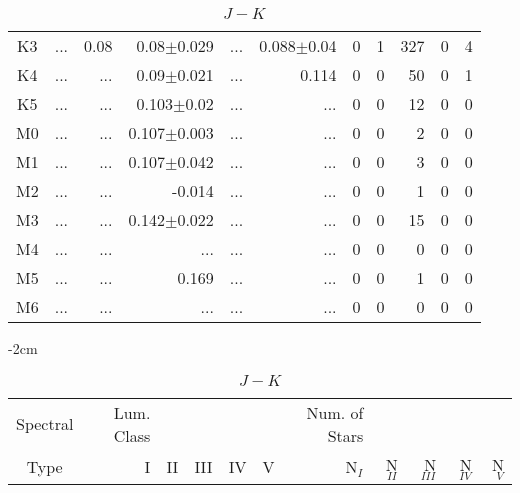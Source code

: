 \begin{table}[t]
\begin{table}[t]
\begin{center}
\begin{tabular}{c|rrrrr|rrrrr}
    K3	&	 ...	&	0.08	&	0.08$\pm$0.029	&	 ...	&	0.088$\pm$0.04	&	0	&	1	&	327	&	0	&	4	\\
    K4	&	 ...	&	 ...	&	0.09$\pm$0.021	&	 ...	&	0.114	&	0	&	0	&	50	&	0	&	1	\\
    K5	&	 ...	&	 ...	&	0.103$\pm$0.02	&	 ...	&	 ...	&	0	&	0	&	12	&	0	&	0	\\
    M0	&	 ...	&	 ...	&	0.107$\pm$0.003	&	 ...	&	 ...	&	0	&	0	&	2	&	0	&	0	\\
    M1	&	 ...	&	 ...	&	0.107$\pm$0.042	&	 ...	&	 ...	&	0	&	0	&	3	&	0	&	0	\\
    M2	&	 ...	&	 ...	&	-0.014	&	 ...	&	 ...	&	0	&	0	&	1	&	0	&	0	\\
    M3	&	 ...	&	 ...	&	0.142$\pm$0.022	&	 ...	&	 ...	&	0	&	0	&	15	&	0	&	0	\\
    M4	&	 ...	&	 ...	&	 ...	&	 ...	&	 ...	&	0	&	0	&	0	&	0	&	0	\\
    M5	&	 ...	&	 ...	&	0.169	&	 ...	&	 ...	&	0	&	0	&	1	&	0	&	0	\\
    M6	&	 ...	&	 ...	&	 ...	&	 ...	&	 ...	&	0	&	0	&	0	&	0	&	0	\\
        \bottomrule
        \end{tabular}
    \end{center}
    \end{table}
    
    \begin{table}[t]
    \tiny
    \centering
    \caption{$J-K$}
    \begin{center}
        \addtolength{\leftskip} {-2cm}
        \addtolength{\rightskip}{-2cm}
        \begin{tabular}{c|rrrrr|rrrrr}
        \toprule
        Spectral & Lum. Class & & & & & Num. of Stars & & & &  \\
        Type & I & II & III &  IV & V & N$_{I}$ & N$_{II}$ & N$_{III}$ & N$_{IV}$ & N$_{V}$ \\ \midrule
      

\end{tabular}
\end{center}
\end{table}
\end{table}
